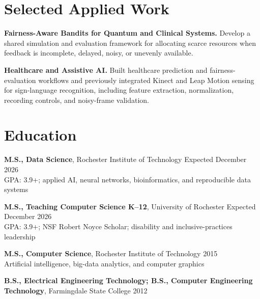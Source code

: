 \documentclass[10pt,letterpaper]{article}
\begin{document}
\section*{Selected Applied Work}
\textbf{Fairness-Aware Bandits for Quantum and Clinical Systems.}
Develop a shared simulation and evaluation framework for allocating scarce
resources when feedback is incomplete, delayed, noisy, or unevenly available.

\textbf{Healthcare and Assistive AI.}
Built healthcare prediction and fairness-evaluation workflows and previously
integrated Kinect and Leap Motion sensing for sign-language recognition,
including feature extraction, normalization, recording controls, and noisy-frame
validation.

\section*{Education}
\textbf{M.S., Data Science}, Rochester Institute of Technology
\hfill Expected December 2026\\
GPA: 3.9+; applied AI, neural networks, bioinformatics, and reproducible data systems

\textbf{M.S., Teaching Computer Science K--12}, University of Rochester
\hfill Expected December 2026\\
GPA: 3.9+; NSF Robert Noyce Scholar; disability and inclusive-practices leadership

\textbf{M.S., Computer Science}, Rochester Institute of Technology
\hfill 2015\\
Artificial intelligence, big-data analytics, and computer graphics

\textbf{B.S., Electrical Engineering Technology; B.S., Computer Engineering Technology},
Farmingdale State College \hfill 2012
\end{document}
